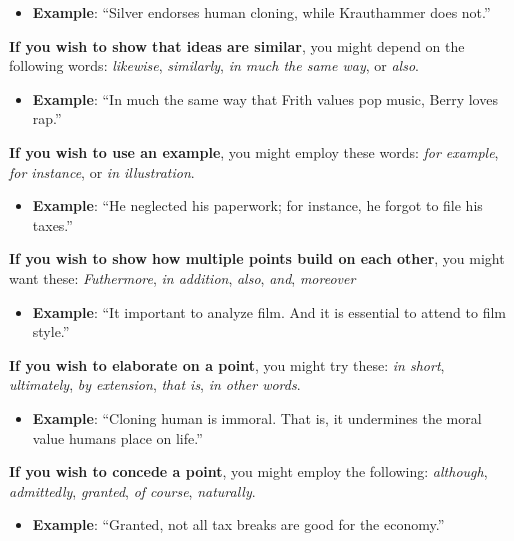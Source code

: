 \begin{itemize}
	\item \textbf{Example}: ``Silver endorses human cloning, while Krauthammer does not.''
\end{itemize}
 
\textbf{If you wish to show that ideas are similar}, you might depend on the following words: \emph{likewise}, \emph{similarly}, \emph{in much the same way}, or \emph{also}.

\begin{itemize}
	\item  \textbf{Example}:  ``In much the same way that Frith values pop music, Berry loves rap.''      
\end{itemize}

\textbf{If you wish to use an example}, you might employ these words: \emph{for example}, \emph{for instance}, or \emph{in illustration}.

\begin{itemize}
	\item \textbf{Example}: ``He neglected his paperwork; for instance, he forgot to file his taxes.''
\end{itemize}
 

\textbf{If you wish to show how multiple points build on each other}, you might want these: \emph{Futhermore}, \emph{in addition}, \emph{also}, \emph{and}, \emph{moreover}

\begin{itemize}
	\item  \textbf{Example}: ``It important to analyze film.  And it is essential to attend to film style.''
\end{itemize}

\textbf{If you wish to elaborate on a point}, you might try these: \emph{in short}, \emph{ultimately}, \emph{by extension}, \emph{that is}, \emph{in other words}.

\begin{itemize}
	\item \textbf{Example}: ``Cloning human is immoral. That is, it undermines the moral value humans place on life.''
\end{itemize}

\textbf{If you wish to concede a point}, you might employ the following: \emph{although}, \emph{admittedly}, \emph{granted}, \emph{of course}, \emph{naturally}.

\begin{itemize}
	\item  \textbf{Example}: ``Granted, not all tax breaks are good for the economy.''
\end{itemize}
        	
